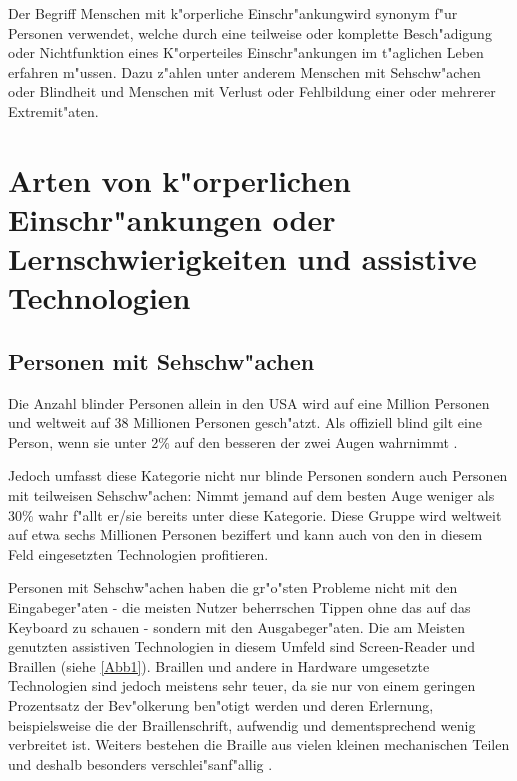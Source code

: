 \documentclass[a4paper,bibtotoc,oneside]{scrbook}
\begin{document}
Der Begriff \glqq Menschen mit k"orperliche Einschr"ankung\grqq wird synonym f"ur Personen verwendet, welche durch eine teilweise oder komplette Besch"adigung oder Nichtfunktion eines K"orperteiles Einschr"ankungen im t"aglichen Leben erfahren m"ussen. Dazu z"ahlen unter anderem Menschen mit Sehschw"achen oder Blindheit und Menschen mit Verlust oder Fehlbildung einer oder mehrerer Extremit"aten.

\chapter{Arten von k"orperlichen Einschr"ankungen oder Lernschwierigkeiten
 und assistive Technologien}

\section{Personen mit Sehschw"achen}
Die Anzahl blinder Personen allein in den USA wird auf eine Million Personen und weltweit auf 38 Millionen Personen gesch"atzt\cite[S. 1]{screen_read}. Als offiziell blind gilt eine Person, wenn sie unter 2\% auf den besseren der zwei Augen wahrnimmt \cite[S. 12]{understand_acc}. 

Jedoch umfasst diese Kategorie nicht nur blinde Personen sondern auch Personen mit teilweisen Sehschw"achen: Nimmt jemand auf dem besten Auge weniger als 30\% wahr f"allt er/sie bereits unter diese Kategorie\cite[S. 12]{understand_acc}.  Diese Gruppe wird weltweit auf etwa sechs Millionen Personen beziffert\cite[S. 249]{screen_read_frust} und kann auch von den in diesem Feld eingesetzten Technologien profitieren.

Personen mit Sehschw"achen haben die gr"o"sten Probleme nicht mit den Eingabeger"aten - die meisten Nutzer beherrschen Tippen ohne das auf das Keyboard zu schauen - sondern mit den Ausgabeger"aten. Die am Meisten genutzten assistiven Technologien in diesem Umfeld sind Screen-Reader und Braillen (siehe \ref{Abb1}). Braillen und andere in Hardware umgesetzte Technologien sind jedoch meistens sehr teuer, da sie nur von einem geringen Prozentsatz der Bev"olkerung ben"otigt werden und deren Erlernung, beispielsweise die der Braillenschrift, aufwendig und dementsprechend wenig verbreitet ist\cite[S. 249-250]{screen_read_frust}.
Weiters bestehen die Braille aus vielen kleinen mechanischen Teilen und deshalb besonders verschlei"sanf"allig \cite[S. 11]{barr_webd}.
\end{document}
